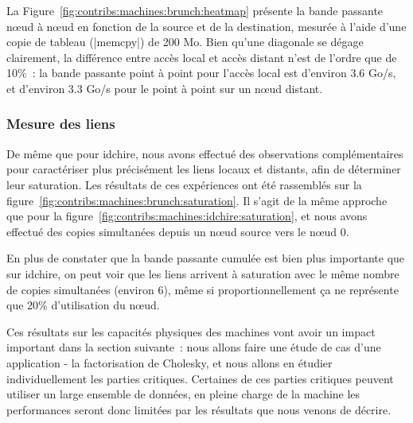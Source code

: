 La Figure~\ref{fig:contribs:machines:brunch:heatmap} présente la bande passante nœud à nœud en fonction de la source et de la destination, mesurée à l'aide d'une copie de tableau (|memcpy|) de 200 Mo.
Bien qu'une diagonale se dégage clairement, la différence entre accès local et accès distant n'est de l'ordre que de 10\%~: la bande passante point à point pour l'accès local est d'environ 3.6 Go/s, et d'environ 3.3 Go/s pour le point à point sur un nœud distant.

\subsubsection{Mesure des liens}

De même que pour idchire, nous avons effectué des observations complémentaires pour caractériser plus précisément les liens locaux et distants, afin de déterminer leur saturation.
Les résultats de ces expériences ont été rassemblés sur la figure~\ref{fig:contribs:machines:brunch:saturation}.
Il s'agit de la même approche que pour la figure~\ref{fig:contribs:machines:idchire:saturation}, et nous avons effectué des copies simultanées depuis un nœud source vers le nœud 0.

En plus de constater que la bande passante cumulée est bien plus importante que sur idchire, on peut voir que les liens arrivent à saturation avec le même nombre de copies simultanées (environ 6), même si proportionnellement ça ne représente que 20\% d'utilisation du nœud.

\bigskip
\bigskip

Ces résultats sur les capacités physiques des machines vont avoir un impact important dans la section suivante~: nous allons faire une étude de cas d'une application - la factorisation de Cholesky, et nous allons en étudier individuellement les parties critiques.
Certaines de ces parties critiques peuvent utiliser un large ensemble de données, en pleine charge de la machine les performances seront donc limitées par les résultats que nous venons de décrire.

